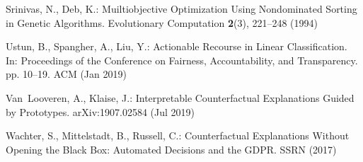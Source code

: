 \documentclass[runningheads, envcountsame, a4paper]{llncs}
\begin{document}
\begin{thebibliography}{10}
Srinivas, N., Deb, K.: Muiltiobjective {{Optimization Using Nondominated
  Sorting}} in {{Genetic Algorithms}}. Evolutionary Computation  \textbf{2}(3),
   221--248 (1994)

Ustun, B., Spangher, A., Liu, Y.: Actionable {{Recourse}} in {{Linear
  Classification}}. In: Proceedings of the {{Conference}} on {{Fairness}},
  {{Accountability}}, and {{Transparency}}. pp. 10--19. ACM (Jan 2019)

Van~Looveren, A., Klaise, J.: Interpretable {{Counterfactual Explanations
  Guided}} by {{Prototypes}}. arXiv:1907.02584  (Jul 2019)

Wachter, S., Mittelstadt, B., Russell, C.: Counterfactual {{Explanations
  Without Opening}} the {{Black Box}}: {{Automated Decisions}} and the
  {{GDPR}}. SSRN  (2017)

\end{thebibliography}
%
%
%
\end{document}
